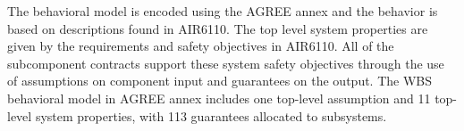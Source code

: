 


The behavioral model is encoded using the AGREE annex and the behavior is based on descriptions found in AIR6110. The top level system properties are given by the requirements and safety objectives in AIR6110. All of the subcomponent contracts support these system safety objectives through the use of assumptions on component input and guarantees on the output. The WBS behavioral model in AGREE annex includes one top-level assumption and  11 top-level system properties, with 113 guarantees allocated to subsystems.  

